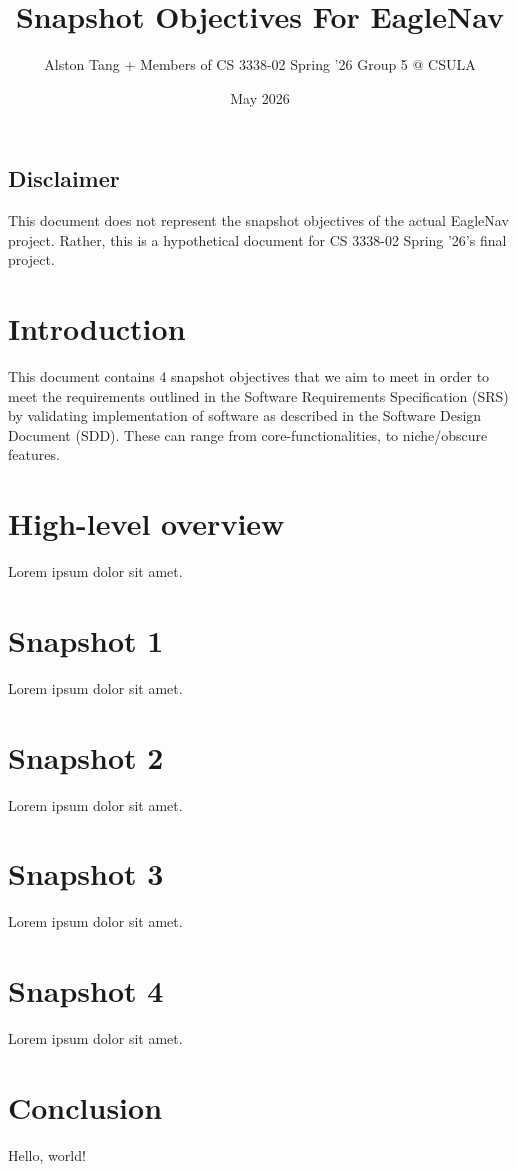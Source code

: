 \documentclass{article}
\title{Snapshot Objectives For EagleNav}
\author{Alston Tang + Members of CS 3338-02 Spring '26 Group 5 @ CSULA}
\date{May 2026}
\begin{document}
\maketitle
\subsection{Disclaimer}
This document does not represent the snapshot objectives of the actual EagleNav project. Rather, this is a hypothetical document for CS 3338-02 Spring '26's final project.

\section{Introduction}
This document contains 4 snapshot objectives that we aim to meet in order to meet the requirements outlined in the Software Requirements Specification (SRS) by validating implementation of software as described in the Software Design Document (SDD). These can range from core-functionalities, to niche/obscure features.

\section{High-level overview}
Lorem ipsum dolor sit amet.

\section{Snapshot 1}
Lorem ipsum dolor sit amet.

\section{Snapshot 2}
Lorem ipsum dolor sit amet.

\section{Snapshot 3}
Lorem ipsum dolor sit amet.

\section{Snapshot 4}
Lorem ipsum dolor sit amet.

\section{Conclusion}
Hello, world!
\end{document}
